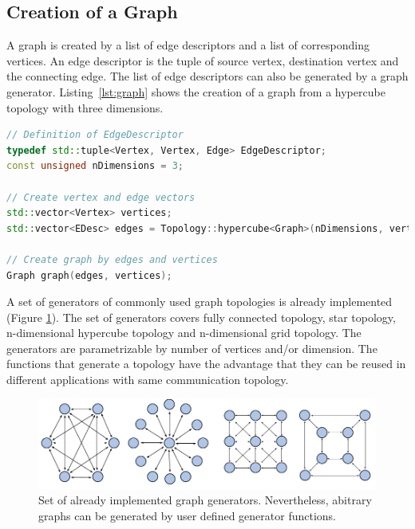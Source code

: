 \subsection{Creation of a Graph}
A graph is created by a list of edge descriptors and a list of
corresponding vertices. An edge descriptor is the tuple of source
vertex, destination vertex and the connecting edge. The list of edge
descriptors can also be generated by a graph
generator. Listing~\ref{lst:graph} shows the creation of a graph from
a hypercube topology with three dimensions.

\begin{lstlisting}[language=C++, label=lst:graph]
// Definition of EdgeDescriptor
typedef std::tuple<Vertex, Vertex, Edge> EdgeDescriptor;
const unsigned nDimensions = 3;

// Create vertex and edge vectors
std::vector<Vertex> vertices;
std::vector<EDesc> edges = Topology::hypercube<Graph>(nDimensions, vertices);

// Create graph by edges and vertices
Graph graph(edges, vertices);

\end{lstlisting}

\noindent A set of generators of commonly used graph topologies is already
implemented (Figure \ref{fig:topologies}).  The set of generators
covers fully connected topology, star topology, n-dimensional
hypercube topology and n-dimensional grid topology.  The generators
are parametrizable by number of vertices and/or dimension.  The
functions that generate a topology have the advantage that they can be
reused in different applications with same communication topology.

\begin{figure}[H]
  \centering
  \includegraphics[width=\textwidth]{graphics/40_topologies}
  \caption{Set of already implemented graph generators. Nevertheless,
  abitrary graphs can be generated by user defined generator functions.}
  \label{fig:topologies}
\end{figure}

